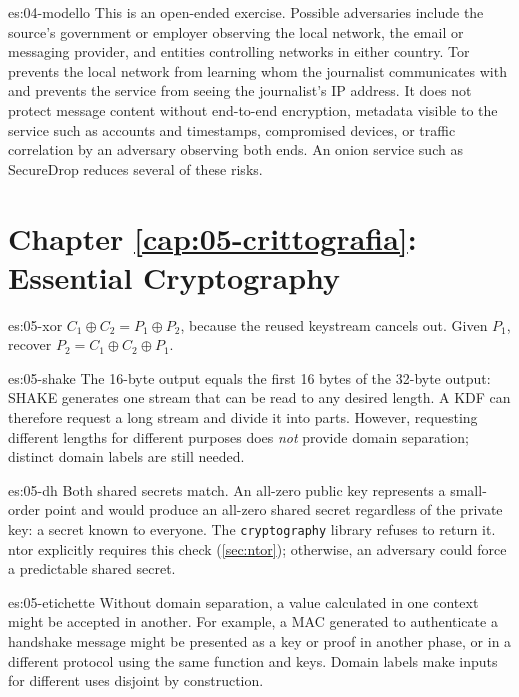 \begin{soluzione}{es:04-modello}
This is an open-ended exercise. Possible adversaries include the source's government or employer observing the local network, the email or messaging provider, and entities controlling networks in either country. Tor prevents the local network from learning whom the journalist communicates with and prevents the service from seeing the journalist's IP address. It does not protect message content without end-to-end encryption, metadata visible to the service such as accounts and timestamps, compromised devices, or traffic correlation by an adversary observing both ends. An onion service such as SecureDrop reduces several of these risks.
\end{soluzione}

\section*{Chapter \ref{cap:05-crittografia}: Essential Cryptography}

\begin{soluzione}{es:05-xor}
$C_1 \oplus C_2 = P_1 \oplus P_2$, because the reused keystream cancels out. Given $P_1$, recover $P_2 = C_1 \oplus C_2 \oplus P_1$.
\end{soluzione}

\begin{soluzione}{es:05-shake}
The 16-byte output equals the first 16 bytes of the 32-byte output: SHAKE generates one stream that can be read to any desired length. A KDF can therefore request a long stream and divide it into parts. However, requesting different lengths for different purposes does \emph{not} provide domain separation; distinct domain labels are still needed.
\end{soluzione}

\begin{soluzione}{es:05-dh}
Both shared secrets match. An all-zero public key represents a small-order point and would produce an all-zero shared secret regardless of the private key: a secret known to everyone. The \texttt{cryptography} library refuses to return it. ntor explicitly requires this check (\cref{sec:ntor}); otherwise, an adversary could force a predictable shared secret.
\end{soluzione}

\begin{soluzione}{es:05-etichette}
Without domain separation, a value calculated in one context might be accepted in another. For example, a MAC generated to authenticate a handshake message might be presented as a key or proof in another phase, or in a different protocol using the same function and keys. Domain labels make inputs for different uses disjoint by construction.
\end{soluzione}


